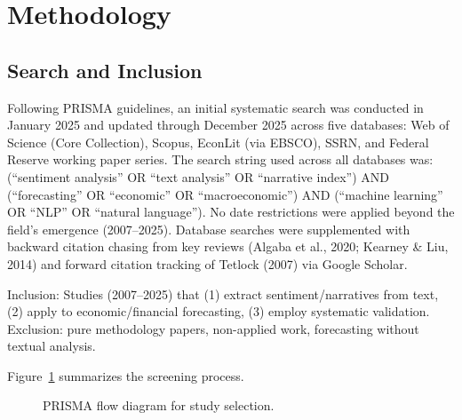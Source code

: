 \documentclass[11pt,twocolumn]{article}
\begin{document}
\section{Methodology}

\subsection{Search and Inclusion}

Following PRISMA guidelines, an initial systematic search was conducted in January 2025 and updated through December 2025 across five databases: Web of Science (Core Collection), Scopus, EconLit (via EBSCO), SSRN, and Federal Reserve working paper series. The search string used across all databases was: (``sentiment analysis'' OR ``text analysis'' OR ``narrative index'') AND (``forecasting'' OR ``economic'' OR ``macroeconomic'') AND (``machine learning'' OR ``NLP'' OR ``natural language''). No date restrictions were applied beyond the field's emergence (2007--2025). Database searches were supplemented with backward citation chasing from key reviews (Algaba et al., 2020; Kearney \& Liu, 2014) and forward citation tracking of Tetlock (2007) via Google Scholar.

Inclusion: Studies (2007--2025) that (1) extract sentiment/narratives from text, (2) apply to economic/financial forecasting, (3) employ systematic validation. Exclusion: pure methodology papers, non-applied work, forecasting without textual analysis.

Figure~\ref{fig:prisma} summarizes the screening process.

\begin{figure}[t]
\centering
\caption{PRISMA flow diagram for study selection.}
\label{fig:prisma}
\small
{}
\end{figure}
\end{document}
